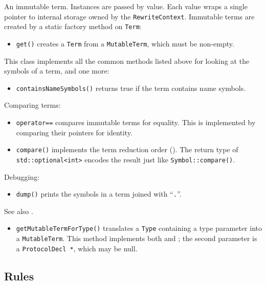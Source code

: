 \documentclass[../generics]{subfiles}
\begin{document}
An immutable term. Instances are passed by value. Each value wraps a single pointer to internal storage owned by the \texttt{RewriteContext}. Immutable terms are created by a static factory method on \texttt{Term}:
\begin{itemize}
\item \texttt{get()} creates a \texttt{Term} from a \texttt{MutableTerm}, which must be non-empty.
\end{itemize}
This class implements all the common methods listed above for looking at the symbols of a term, and one more:
\begin{itemize}
\item \texttt{containsNameSymbols()} returns true if the term contains name symbols.
\end{itemize}
Comparing terms:
\begin{itemize}
\item \texttt{operator==} compares immutable terms for equality. This is implemented by comparing their pointers for identity.
\item \texttt{compare()} implements the term reduction order (). The return type of \texttt{std::optional<int>} encodes the result just like \texttt{Symbol::compare()}.
\end{itemize}
Debugging:
\begin{itemize}
\item \texttt{dump()} prints the symbols in a term joined with ``\texttt{.}''.
\end{itemize}

See also .

\begin{itemize}
\item \texttt{getMutableTermForType()} translates a \texttt{Type} containing a type parameter into a \texttt{MutableTerm}. This method implements both  and ; the second parameter is a \texttt{ProtocolDecl *}, which may be null.
\end{itemize}

\subsection*{Rules}
\end{document}

